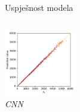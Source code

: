 \documentclass[croatian, 12pt, usepdftitle = false, xcolor = {{usenames, dvipsnames, svgnames, x11names}}, hyperref = {unicode}]{beamer}
\begin{document}
\begin{frame}{Uspješnost modela}
{\begin{columns}
                \begin{column}{0.5\textwidth}
                    \centering
                    \tiny
                    \includegraphics[width = 31.2mm]{figures/convolutional_neural_network_prediction.pdf}
                    \\
                    \emph{CNN}
                \end{column}
            \end{columns}%
        }%
\end{frame}
\end{document}
